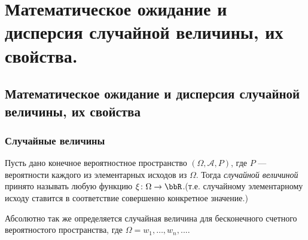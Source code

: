 \chapter{Математическое ожидание и дисперсия случайной величины, их свойства.}
\section{Математическое ожидание и дисперсия случайной величины, их свойства}

\subsection{Случайные величины}

Пусть дано конечное вероятностное пространство $(\Omega,\mathcal A, P)$, где $P$ --- вероятности каждого из элементарных исходов из $\Omega$. Тогда \textit{случайной величиной} принято называть любую функцию $\xi\colon \Omega \to \bbR$.(т.е. случайному элементарному исходу ставится в соответствие совершенно конкретное значение.)

Абсолютно так же определяется случайная величина для бесконечного счетного вероятностого пространства, где $\Omega = {w_1,\dots, w_n,...}$.

